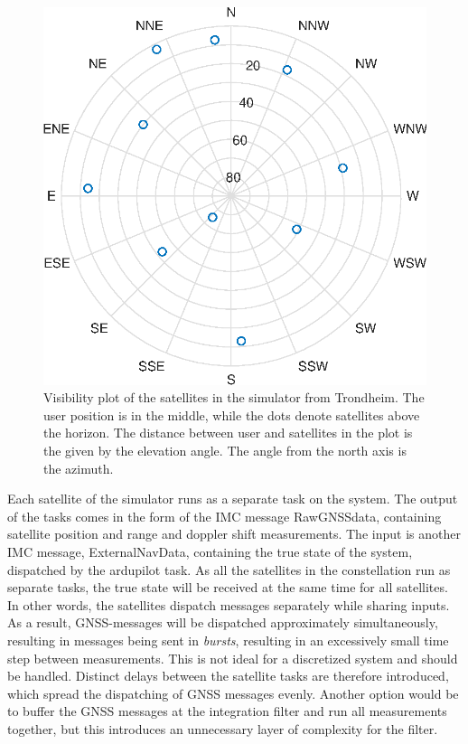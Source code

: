         \begin{figure}[!htbp]
            \centering
            \includegraphics[scale=0.7]{Implementation/Images/visibilityplot.eps}
            \caption[Visibility plot of simulated satellites]{Visibility plot of the satellites in the simulator from Trondheim. The user position is in the middle, while the dots denote satellites above the horizon. The distance between user and satellites in the plot is the given by the elevation angle. The angle from the north axis is the azimuth.}
            \label{fig:visplot}
        \end{figure}

    Each satellite of the simulator runs as a separate task on the system. The output of the tasks comes in the form of the IMC message RawGNSSdata, containing satellite position and range and doppler shift measurements. The input is another IMC message, ExternalNavData, containing the true state of the system, dispatched by the ardupilot task. As all the satellites in the constellation run as separate tasks, the true state will be received at the same time for all satellites. In other words, the satellites dispatch messages separately while sharing inputs. As a result, GNSS-messages will be dispatched approximately simultaneously, resulting in messages being sent in \textit{bursts}, resulting in an excessively small time step between measurements. This is not ideal for a discretized system and should be handled. Distinct delays between the satellite tasks are therefore introduced, which spread the dispatching of GNSS messages evenly. Another option would be to buffer the GNSS messages at the integration filter and run all measurements together, but this introduces an unnecessary layer of complexity for the filter. \\
    
